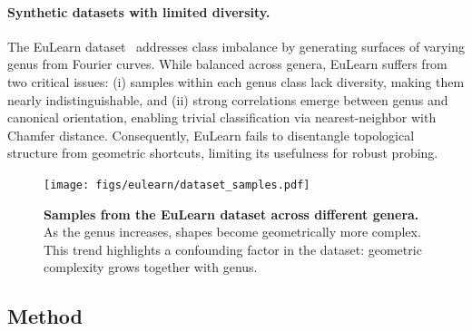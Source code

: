 \paragraph{Synthetic datasets with limited diversity.} 
The EuLearn dataset~\cite{eulearn} addresses class imbalance by generating surfaces of varying genus from Fourier curves. While balanced across genera, EuLearn suffers from two critical issues: (i) samples within each genus class lack diversity, making them nearly indistinguishable, and (ii) strong correlations emerge between genus and canonical orientation, enabling trivial classification via nearest-neighbor with Chamfer distance. Consequently, EuLearn fails to disentangle topological structure from geometric shortcuts, limiting its usefulness for robust probing.





\begin{figure}[h]
  \centering
  \texttt{[image: figs/eulearn/dataset\_samples.pdf]}
   \caption{\textbf{Samples from the EuLearn dataset across different genera.} As the genus increases, shapes become geometrically more complex. This trend highlights a confounding factor in the dataset: geometric complexity grows together with genus.}
   \label{fig:eulearn-samples}
\end{figure}


\subsection{Method}
\label{ssec:topogen-method}

